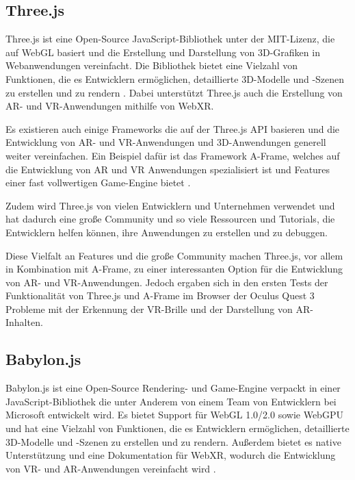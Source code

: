 \subsection{Three.js}

Three.js ist eine Open-Source JavaScript-Bibliothek unter der MIT-Lizenz, die auf WebGL basiert und die Erstellung und Darstellung von 3D-Grafiken in Webanwendungen vereinfacht.
Die Bibliothek bietet eine Vielzahl von Funktionen, die es Entwicklern ermöglichen, detaillierte 3D-Modelle und -Szenen zu erstellen und zu rendern \autocite[][]{threejs-docs}.
Dabei unterstützt Three.js auch die Erstellung von AR- und VR-Anwendungen mithilfe von WebXR.

Es existieren auch einige Frameworks die auf der Three.js API basieren und die Entwicklung von AR- und VR-Anwendungen und 3D-Anwendungen generell weiter vereinfachen.
Ein Beispiel dafür ist das Framework A-Frame, welches auf die Entwicklung von AR und VR Anwendungen spezialisiert ist und Features einer fast vollwertigen Game-Engine bietet \autocite[]{a-frame-introduction}.

Zudem wird Three.js von vielen Entwicklern und Unternehmen verwendet und hat dadurch eine große Community und so viele Ressourcen und Tutorials, die Entwicklern helfen können, ihre Anwendungen zu erstellen und zu debuggen.

Diese Vielfalt an Features und die große Community machen Three.js, vor allem in Kombination mit A-Frame, zu einer interessanten Option für die Entwicklung von AR- und VR-Anwendungen.
Jedoch ergaben sich in den ersten Tests der Funktionalität von Three.js und A-Frame im Browser der Oculus Quest 3 Probleme mit der Erkennung der VR-Brille und der Darstellung von AR-Inhalten.

\subsection{Babylon.js}

Babylon.js ist eine Open-Source Rendering- und Game-Engine verpackt in einer JavaScript-Bibliothek die unter Anderem von einem Team von Entwicklern bei Microsoft entwickelt wird.
Es bietet Support für WebGL 1.0/2.0 sowie WebGPU und hat eine Vielzahl von Funktionen, die es Entwicklern ermöglichen, detaillierte 3D-Modelle und -Szenen zu erstellen und zu rendern.
Außerdem bietet es native Unterstützung und eine Dokumentation für WebXR, wodurch die Entwicklung von VR- und AR-Anwendungen vereinfacht wird \autocite[][]{babylon-features}.

